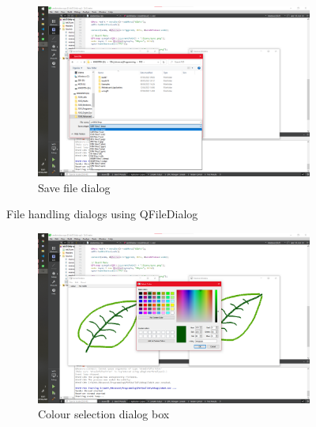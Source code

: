 \documentclass[10pt]{article}
\newcommand{\figsquish}{\vspace{-5mm}} %
\begin{document}
\begin{multicols*}{2}
\begin{figure}[H]
\begin{subfigure}[t]{0.48\columnwidth}
		\includegraphics[width=\columnwidth]{./save.png}
		\caption{Save file dialog}
		\label{fig:save}
	\end{subfigure}
	\caption{File handling dialogs using QFileDialog}
	\label{fig:fileDialogs}
\end{figure}
\figsquish

\begin{figure}[H]
	\centering
	\begin{subfigure}[t]{0.48\columnwidth}

		\includegraphics[width=\columnwidth]{./colour.png}
		\caption{Colour selection dialog box}
		\label{fig:colour}
	\end{subfigure}
	\hfill
	\begin{subfigure}[t]{0.48\columnwidth}


\end{subfigure}
\end{figure}
\end{multicols*}
\end{document}

